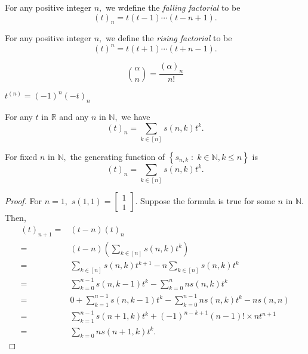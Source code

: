 
\begin{definition}
	For any positive integer $n,$ we wdefine the \emph{falling factorial} to be 
	$$ (t)_n = t(t-1) \cdots (t - n+1).$$
\end{definition}


\begin{definition}
	For any positive integer $n,$ we define the \emph{rising factorial} to be 
	$$ (t)^n = t(t+1) \cdots (t + n-1).$$
\end{definition}


\begin{remark}
	$$\binom{ \alpha } {n} = \frac{( \alpha)_n}{n!} $$
\end{remark}

\begin{remark}
	$ t^{(n)} = (-1)^n (-t)_n $
\end{remark}


\begin{theorem}
	For any $t$ in $\mathbb{R}$ and any $n $ in $\mathbb{N},$ we have
	$$(t)_n = \sum_{k \in [n]} s(n,k) t^k. $$
\end{theorem}

\begin{remark}
	For fixed $n$ in $\mathbb{N},$ the generating function of 
	$\left\{ s_{n,k} \;:\; k \in \mathbb{N} , k \leq n \right\} $ is
	$$ (t)_n = \sum_{k \in [n]} s(n,k)t^k. $$
\end{remark}
\begin{proof}
	For $n=1,$ $s(1,1) = 
	\begin{bmatrix} 1\\1 \end{bmatrix}.$
Suppose the formula is true for some $n$ in $\mathbb{N}.$ Then,
\begin{align*}
	(t)_{n+1}
	={}& (t-n) (t)_n \\
	={}& (t-n) \left( \sum_{k \in [n]} s(n,k) t^k \right)  \\
	={}& \sum_{k \in [n]} s(n,k) t^{k+1} - n \sum_{k \in [n]} s(n,k) t^k  \\
	={}& \sum_{k=0}^{n-1} s(n,k-1) t^k - \sum_{k=0}^{n} n s(n,k) t^k\\
	={}& 0 + \sum_{k=1}^{n-1}  s(n,k-1) t^k - \sum_{k=0}^{n-1} n 
	s(n,k) t^k - n s(n,n) \\
	={}& \sum_{k=1}^{n-1} s(n+1,k) t^k + (-1)^{n-k+1} (n-1)! \times n t^{n+1}\\
	={}& \sum_{k=0}{n} s(n+1,k) t^k.
\end{align*}
\end{proof}



